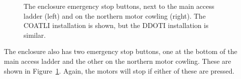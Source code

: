 \begin{figure}
\begin{center}
\end{center}
\caption{The enclosure emergency stop buttons, next to the main access ladder (left) and on the northern motor cowling (right).
\ifddoti
The COATLI installation is shown, but the DDOTI installation is similar.
\fi
}
\label{figure:enclosure-emergency-stop}
\end{figure}

The enclosure also has two emergency stop buttons, one at the bottom of the main access ladder and the other on the northern motor cowling. These are shown in Figure~\ref{figure:enclosure-emergency-stop}. Again, the motors will stop if either of these are pressed.

